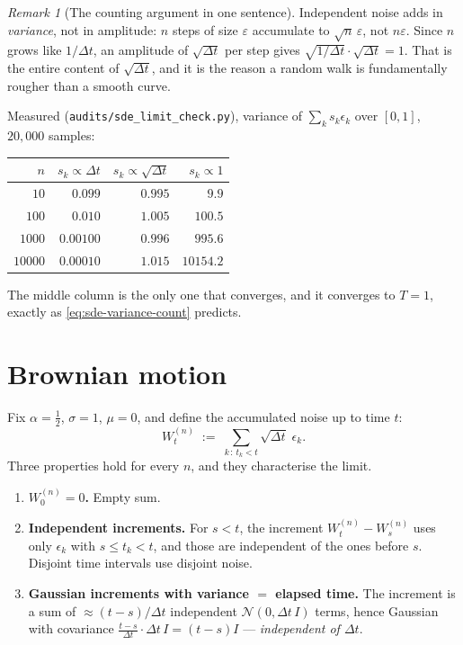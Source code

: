 \documentclass[11pt,a4paper]{report}
\theoremstyle{definition}
\theoremstyle{remark}
\newtheorem{remark}[remark]{Remark}
\newcommand{\file}[1]{\texttt{#1}}
\begin{document}
\begin{remark}[The counting argument in one sentence]
\label{rem:sde-counting}
Independent noise adds in \emph{variance}, not in amplitude: $n$ steps of
size $\varepsilon$ accumulate to $\sqrt{n}\,\varepsilon$, not $n\varepsilon$.
Since $n$ grows like $1/\Delta t$, an amplitude of $\sqrt{\Delta t}$ per step
gives $\sqrt{1/\Delta t}\cdot\sqrt{\Delta t}=1$. That is the entire content
of $\sqrt{\Delta t}$, and it is the reason a random walk is fundamentally
rougher than a smooth curve.
\end{remark}

Measured (\file{audits/sde\_limit\_check.py}), variance of $\sum_k
s_k\epsilon_k$ over $[0,1]$, $20{,}000$ samples:

\begin{center}
\begin{tabular}{rrrr}
\toprule
$n$ & $s_k\propto\Delta t$ & $s_k\propto\sqrt{\Delta t}$ & $s_k\propto1$ \\
\midrule
$10$ & $0.099$ & $0.995$ & $9.9$ \\
$100$ & $0.010$ & $1.005$ & $100.5$ \\
$1000$ & $0.00100$ & $0.996$ & $995.6$ \\
$10000$ & $0.00010$ & $1.015$ & $10154.2$ \\
\bottomrule
\end{tabular}
\end{center}

The middle column is the only one that converges, and it converges to
$T=1$, exactly as \eqref{eq:sde-variance-count} predicts.

\section{Brownian motion}
\label{sec:sde-brownian}

Fix $\alpha=\tfrac12$, $\sigma=1$, $\mu=0$, and define the accumulated noise
up to time $t$:
\begin{equation}
W^{(n)}_t \;:=\; \sum_{k\,:\,t_k<t}\sqrt{\Delta t}\;\epsilon_k .
\end{equation}
Three properties hold for every $n$, and they characterise the limit.

\begin{enumerate}
\item \textbf{$W^{(n)}_0=0$.} Empty sum.
\item \textbf{Independent increments.} For $s<t$, the increment
      $W^{(n)}_t-W^{(n)}_s$ uses only $\epsilon_k$ with $s\le t_k<t$, and
      those are independent of the ones before $s$. Disjoint time intervals
      use disjoint noise.
\item \textbf{Gaussian increments with variance $=$ elapsed time.} The
      increment is a sum of $\approx(t-s)/\Delta t$ independent
      $\mathcal N(0,\Delta t\,I)$ terms, hence Gaussian with covariance
      $\frac{t-s}{\Delta t}\cdot\Delta t\,I=(t-s)I$ --- \emph{independent of
      $\Delta t$}.
\end{enumerate}
\end{document}
